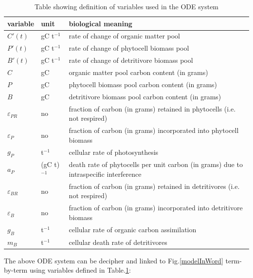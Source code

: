 \documentclass[../thesis.tex]{subfiles} %
\newcommand{\gP}{g_P}
\newcommand{\eP}{\varepsilon_P}
\newcommand{\aP}{a_P}
\newcommand{\ePR}{\varepsilon_{PR}}
\newcommand{\gB}{g_B}
\newcommand{\eB}{\varepsilon_B}
\newcommand{\mB}{m_B}
\newcommand{\eBR}{\varepsilon_{BR}}
\begin{document}
\begin{table}[H]
    \centering
    \caption[Algebra variables definitions]{Table showing definition of variables used in the ODE system}
    \begin{tabular}{p{.1\linewidth}p{.1\linewidth}p{.7\linewidth}}\hline
        variable & unit & biological meaning \\\hline
        $C'(t)$ & gC t$^{-1}$ & rate of change of organic matter pool\\
        $P'(t)$ & gC t$^{-1}$ & rate of change of phytocell biomass pool\\
        $B'(t)$ & gC t$^{-1}$ & rate of change of detritivore biomass pool\\
        $C$ & gC & organic matter pool carbon content (in grams)\\
        $P$ & gC & phytocell  biomass pool carbon content (in grams)\\
        $B$ & gC & detritivore biomass pool carbon content (in grams)\\
        $\ePR$ & no & fraction of carbon (in grams) retained in phytocells (i.e. not respired)\\
        $\eP$ & no & fraction of carbon (in grams) incorporated into phytocell biomass\\
        $\gP$ & t$^{-1}$ & cellular rate of photosynthesis\\
        $\aP$ & (gC t)$^{-1}$ & death rate of phytocells per unit carbon (in grams) due to intraspecific interference\\
        $\eBR$ & no & fraction of carbon (in grams) retained in detritivores (i.e. not respired)\\
        $\eB$ & no & fraction of carbon (in grams) incorporated into detritivore biomass\\
        $\gB$ & t$^{-1}$ & cellular rate of organic carbon assimilation\\
        $\mB$ & t$^{-1}$ & cellular death rate of detritivores\\\hline
    \end{tabular}
    \label{varInTab}
\end{table}

The above ODE system can be decipher and linked to Fig.\ref{modelInWord} term-by-term using variables defined in Table.\ref{varInTab}:
\end{document}
